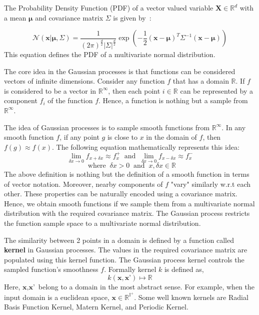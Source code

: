 \documentclass[12pt, twoside, ngerman]{report}
\begin{document}
The Probability Density Function (PDF) of a vector valued variable $\textbf{X} \in \mathbb{R}^d$ with a mean $\boldsymbol{\mu}$ and covariance matrix $\Sigma$ is given by~\cite{MITMLBook}:

$$
\mathcal{N}(\textbf{x} | \boldsymbol{\mu},  \Sigma) = 
\frac{1}{(2\pi)^{\frac{d}{2}} |\Sigma|^{\frac{d}{2}}}
\exp\left( - \frac{1}{2} (\textbf{x} - \boldsymbol{\mu})^T  \Sigma^{-1}   (\textbf{x} - \boldsymbol{\mu}) \right)
$$
This equation defines the PDF of a multivariate normal distribution.

The core idea in the Gaussian processes is that functions can be considered vectors of infinite dimensions.
Consider any function $f$ that has a domain $\mathbb{R}$.
If $f$ is considered to be a vector in $\mathbb{R}^{\infty}$,
then each point $i \in \mathbb{R}$  can be represented by a component $f_i$ of the function $f$.
Hence, a function is nothing but a sample from $\mathbb{R}^{\infty}$.

The idea of Gaussian processes is to sample smooth functions from $\mathbb{R}^{\infty}$.
In any smooth function $f$, if any point $g$ is close to $x$ in the domain of $f$, then $f(g) \approx f(x)$.
The following equation mathematically represents this idea:
$$
\lim_{\delta x \to 0} f_{x + \delta x} \approx f^{+}_x  \;\; \textrm{and} \;\; 
\lim_{\delta x \to 0} f_{x - \delta x} \approx f^{-}_x 
$$
$$\;\; \textrm{where} \;\; \delta x > 0 \;\; \textrm{and} \;\; x, \delta x \in \mathbb{R}
$$
The above definition is nothing but the definition of a smooth function in terms of vector notation. 
Moreover, nearby components of $f$ "vary" similarly w.r.t each other.
These properties can be naturally encoded using a covariance matrix.
Hence, we obtain smooth functions if we sample them from a multivariate normal distribution with the required covariance matrix.
The Gaussian process restricts the function sample space to a multivariate normal distribution.

The similarity between 2 points in a domain is defined by a function called \textbf{kernel} in Gaussian processes.
The values in the required covariance matrix are populated using this kernel function.
The Gaussian process kernel controls the sampled function's smoothness $f$.
Formally kernel $k$ is defined as,
$$
k(\textbf{x}, \textbf{x'}) \mapsto \mathbb{R}
$$
Here, $\textbf{x}, \textbf{x'}$ belong to a domain in the most abstract sense.
For example,  when the input domain is a euclidean space,  $\textbf{x} \in \mathbb{R}^{\mathbb{I}^+}$.
Some well known kernels are Radial Basis Function Kernel,  Matern Kernel,  and Periodic Kernel.
\end{document}
